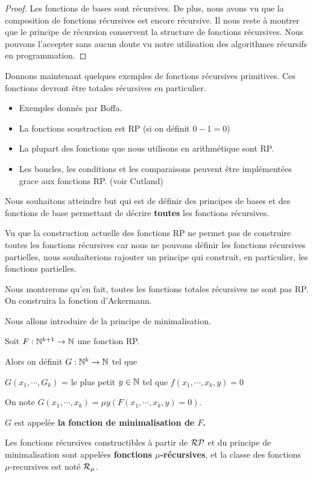 \ifdefined\outputproof
\begin{proof}
	Les fonctions de bases sont récursives. De plus, nous avons vu que la
	composition de fonctions récursives est encore récursive. Il nous reste à
	montrer que le principe de récursion conservent la structure de fonctions
	récursives. Nous pouvons l'accepter sans aucun doute vu notre utilisation
	des algorithmes récursifs en programmation.
\end{proof}
\fi

Donnons maintenant quelques exemples de fonctions récursives primitives. Ces
fonctions devront être totales récursives en particulier.

\begin{exemple}
	\begin{itemize}
		\item Exemples donnés par Boffa.
		\item La fonctions soustraction est RP (si on définit $0 - 1 = 0$)
		\item La plupart des fonctions que nous utilisons en arithmétique sont
			RP.
		\item Les boucles, les conditions et les comparaisons peuvent être
			implémentées grace aux fonctions RP. (voir Cutland)
	\end{itemize}
\end{exemple}

Nous souhaitons atteindre but qui est de définir des principes de bases et des
fonctions de base permettant de décrire \textbf{toutes} les fonctions
récursives.

Vu que la construction actuelle des fonctions RP ne permet pas de construire
toutes les fonctions récursives car nous ne pouvons définir les fonctions
récursives partielles, nous souhaiterions rajouter un principe qui construit, en
particulier, les fonctions partielles.

Nous montrerons qu'en fait, toutes les fonctions totales récursives ne sont pas
RP. On construira la fonction d'Ackermann.

Nous allons introduire de la principe de minimalisation.

\begin{definition} 
	Soit $F : \mathbb{N}^{k + 1} \rightarrow \mathbb{N}$ une fonction RP.

	Alors on définit
	$G : \mathbb{N}^{k} \rightarrow \mathbb{N}$ tel que

	$G(x_{1}, \cdots, G_{k})$ = le plus petit $y \in \mathbb{N}$ tel que $f(x_{1}, \cdots, x_{k}, y) = 0$

	On note $G(x_{1}, \cdots, x_{k}) = \mu y(F(x_{1}, \cdots, x_{k}, y) = 0)$.

	$G$ est appelée \textbf{la fonction de minimalisation de $F$.}

	Les fonctions récursives constructibles à partir de
	$\mathcal{RP}$ et du principe de minimalisation sont
	appelées \textbf{fonctions $\mu$-récursives}, et la classe des fonctions
	$\mu$-recursives est noté $\mathcal{R}_{\mu}$.
\end{definition}

